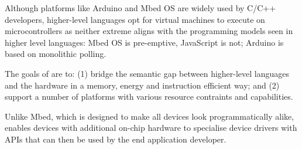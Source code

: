 Although platforms like Arduino and Mbed OS are widely used by C/C++ developers, 
higher-level languages opt for virtual machines to execute on microcontrollers 
as neither extreme aligns with the programming models seen in higher level languages: 
Mbed OS is pre-emptive, JavaScript is not; Arduino is based on monolithic polling. 

The goals of \CO are to: (1) bridge the semantic gap between 
higher-level languages and the hardware in a memory, energy and instruction 
efficient way; and (2) support a number of platforms with various
resource contraints and capabilities.

Unlike Mbed, which is designed to make all devices look programmatically alike,
\CO enables devices with additional on-chip hardware to specialise device drivers 
with APIs that can then be used by the end application developer.


